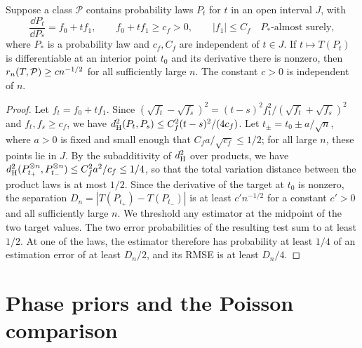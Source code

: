 \begin{lemma}\label{lem:parametric-path}
Suppose a class $\mathcal P$ contains probability laws $P_t$ for
$t$ in an open interval $J$, with
\[
 \frac{\dd P_t}{\dd P_*}=f_0+t f_1,\qquad
 f_0+t f_1\ge c_f>0,\qquad |f_1|\le C_f
 \quad P_*\text{-almost surely},
\]
where $P_*$ is a probability law and $c_f,C_f$ are independent
of $t\in J$. If $t\mapsto T(P_t)$ is differentiable at an
interior point $t_0$ and its derivative there is nonzero, then
$r_n(T,\mathcal P)\ge c n^{-1/2}$ for all sufficiently large
$n$. The constant $c>0$ is independent of $n$.
\end{lemma}

\begin{proof}
Let $f_t=f_0+tf_1$. Since
$(\sqrt{f_t}-\sqrt{f_s})^2=(t-s)^2f_1^2/(\sqrt{f_t}+\sqrt{f_s})^2$ and
$f_t,f_s\ge c_f$, we have
$d_{\rm H}^2(P_t,P_s)\le C_f^2(t-s)^2/(4c_f)$. Let
$t_\pm=t_0\pm a/\sqrt n$, where $a>0$ is fixed and small enough that
$C_fa/\sqrt{c_f}\le1/2$; for all large $n$, these points lie in $J$.
By the subadditivity of $d_{\rm H}^2$ over products, we have
$d_{\rm H}^2(P_{t_+}^{\otimes n},P_{t_-}^{\otimes n})\le C_f^2a^2/c_f\le1/4$,
so that the total variation distance between the product laws is at
most $1/2$. Since the derivative of the target at $t_0$ is nonzero, the
separation $D_n=|T(P_{t_+})-T(P_{t_-})|$ is at least $c'n^{-1/2}$ for a
constant $c'>0$ and all sufficiently large $n$. We threshold any
estimator at the midpoint of the two target values. The two error
probabilities of the resulting test sum to at least $1/2$. At one of
the laws, the estimator therefore has probability at least $1/4$ of an
estimation error of at least $D_n/2$, and its RMSE is at least $D_n/4$.
\end{proof}

\section{Phase priors and the Poisson comparison}
\label{sec:lower-preparation}

